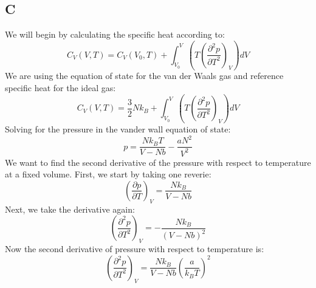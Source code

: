 \documentclass{article}
\begin{document}
\subsection{C}
We will begin by calculating the specific heat according to:
\begin{equation}
    C_{V}(V, T) = C_{V}(V_{0},T) + \int_{V_{0}}^{V} \left( T \left( \frac{\partial^2 p}{\partial T^2} \right)_V \right) dV
\end{equation}
We are using the equation of state for the van der Waals gas and reference specific heat for the ideal gas:
\begin{equation}
    C_{V}(V, T) = \frac{3}{2} N k_{B} + \int_{V_{0}}^{V} \left( T \left( \frac{\partial^2 p}{\partial T^2} \right)_V \right) dV
\end{equation}
Solving for the pressure in the vander wall equation of state:
\begin{equation}
    p = \frac{N k_{B} T}{V - N b} - \frac{a N^2}{V^2}
\end{equation}
We want to find the second derivative of the pressure with respect to temperature at a fixed volume. First, we start by taking one reverie:
\begin{equation}
    \left( \frac{\partial p}{\partial T} \right)_V = \frac{N k_{B}}{V - N b}    
\end{equation}
Next, we take the derivative again:
\begin{equation}
    \left( \frac{\partial^2 p}{\partial T^2} \right)_V = -\frac{N k_{B}}{(V - N b)^2}
\end{equation}
Now the second derivative of pressure with respect to temperature is:
\begin{equation}
    \left( \frac{\partial^2 p}{\partial T^2} \right)_V = \frac{N k_{B}}{V - N b} \left( \frac{a}{k_{B} T} \right)^2
\end{equation}
\end{document}
